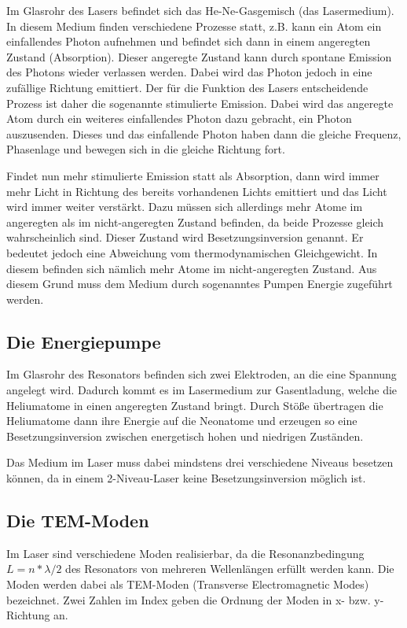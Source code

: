 Im Glasrohr des Lasers befindet sich das He-Ne-Gasgemisch (das Lasermedium). In diesem Medium finden verschiedene Prozesse
statt, z.B. kann ein Atom ein einfallendes Photon aufnehmen und befindet sich dann in einem angeregten Zustand (Absorption).
Dieser angeregte Zustand kann durch spontane Emission des Photons wieder verlassen werden. Dabei wird das Photon jedoch
in eine zufällige Richtung emittiert. Der für die Funktion des Lasers entscheidende Prozess ist daher die sogenannte stimulierte
Emission. Dabei wird das angeregte Atom durch ein weiteres einfallendes Photon dazu gebracht, ein Photon auszusenden.
Dieses und das einfallende Photon haben dann die gleiche Frequenz, Phasenlage und bewegen sich in die gleiche Richtung fort.

Findet nun mehr stimulierte Emission statt als Absorption, dann wird immer mehr Licht in Richtung des
bereits vorhandenen Lichts emittiert und das Licht wird immer weiter verstärkt. Dazu müssen sich allerdings mehr Atome im
angeregten als im nicht-angeregten Zustand befinden, da beide Prozesse gleich wahrscheinlich sind. Dieser Zustand wird
Besetzungsinversion genannt.
Er bedeutet jedoch eine Abweichung vom thermodynamischen Gleichgewicht. In diesem befinden sich nämlich mehr Atome im nicht-angeregten
Zustand. Aus diesem Grund muss dem Medium durch sogenanntes Pumpen Energie zugeführt werden.

\subsection{Die Energiepumpe}

Im Glasrohr des Resonators befinden sich zwei Elektroden, an die eine Spannung angelegt wird. Dadurch kommt es im Lasermedium
zur Gasentladung, welche die Heliumatome in einen angeregten Zustand bringt. Durch Stöße übertragen die Heliumatome dann
ihre Energie auf die Neonatome und erzeugen so eine Besetzungsinversion zwischen energetisch hohen und niedrigen
Zuständen.

Das Medium im Laser muss dabei mindstens drei verschiedene Niveaus besetzen können, da in einem 2-Niveau-Laser keine
Besetzungsinversion möglich ist.

\subsection{Die TEM-Moden}

Im Laser sind verschiedene Moden realisierbar, da die Resonanzbedingung $L = n*\lambda/2$ des Resonators von mehreren Wellenlängen
erfüllt werden kann. Die Moden werden dabei als TEM-Moden (Transverse Electromagnetic Modes) bezeichnet. Zwei Zahlen
im Index geben die Ordnung der Moden in x- bzw. y-Richtung an.


